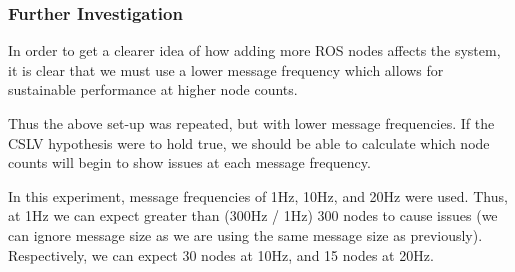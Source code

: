 \documentclass[../dissertation.tex]{subfiles}
\begin{document}
\subsubsection{Further Investigation}

In order to get a clearer idea of how adding more ROS nodes affects the system, it is clear that we must use a lower message frequency which allows for sustainable performance at higher node counts.

Thus the above set-up was repeated, but with lower message frequencies. If the CSLV hypothesis were to hold true, we should be able to calculate which node counts will begin to show issues at each message frequency.

In this experiment, message frequencies of 1Hz, 10Hz, and 20Hz were used. Thus, at 1Hz we can expect greater than (300Hz / 1Hz) 300 nodes to cause issues (we can ignore message size as we are using the same message size as previously). Respectively, we can expect 30 nodes at 10Hz, and 15 nodes at 20Hz.
\end{document}
